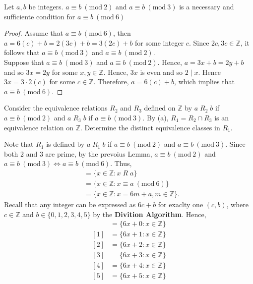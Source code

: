 \documentclass[12pt]{article}
\newcommand{\Z}{\mathbb{Z}}
\newcommand{\Mod}[1]{\ (\mathrm{mod}\ #1)}
\newenvironment{lemma}[2][Lemma]{\begin{trivlist}
		\item[\hskip \labelsep {\bfseries #1}\hskip \labelsep {\bfseries #2.}]}{\end{trivlist}}
\newenvironment{problem}[2][Problem]{\begin{trivlist}
		\item[\hskip \labelsep {\bfseries #1}\hskip \labelsep {\bfseries #2.}]}{\end{trivlist}}
\newenvironment{solution}[2][Solution]{\begin{trivlist}
		\item[\hskip \labelsep {\bfseries #1}\hskip \labelsep {\bfseries #2.}]}{\end{trivlist}}
\begin{document}
\begin{problem}{41}
\begin{enumerate}[label=(\alph*)]
 		\begin{lemma}{8.4.1}
 			Let  $a,b$ be integers. $a \equiv b \Mod{2}$ and $a\equiv b \Mod{3}$ is a necessary and sufficiente condition for $a\equiv b \Mod{6}$
 			\begin{proof}
 				Assume that $a\equiv b \Mod{6}$, then $a=6(c) +b = 2(3c) + b = 3(2c)+b$ for some integer $c$. Since $2c,3c\in \Z$, it follows that $a \equiv b \Mod{3}$ and $a\equiv b \Mod{2}$. \\
 				Suppose that $a \equiv b \Mod{3}$ and $a\equiv b \Mod{2}$. Hence, $a=3x+b=2y+b$ and so $3x=2y$ for some $x,y\in \Z$. Hence, $3x$ is even and so $2 \mid x$.  Hence $3x = 3\cdot 2(c)$ for some $c\in \Z$. Therefore, $a=6(c) + b$, which implies that $a\equiv b \Mod{6}$.
 			\end{proof}
 		\end{lemma}
 			\item Consider the equivalence relations $R_{2}$ and $R_{3}$ defined on $\Z$ by $a\; R_{2} \;b$ if $a\equiv b \Mod 2$ and $a\; R_{3}\; b$ if $a\equiv b \Mod{3}$. By (a), $R_{1} = R_{2}\cap R_{3}$ is an equivalence relation on $\Z$. Determine the distinct equivalence classes in $R_{1}$.
 			\begin{solution}{b}
 				Note that $R_{1}$ is defined by $a\; R_{1}\; b$ if $a\equiv b \Mod 2$ and $a\equiv b \Mod{3}$. Since both 2 and 3 are prime, by the prevoius Lemma, $a\equiv b \Mod 2$ and $a\equiv b \Mod{3} \iff a\equiv b\Mod{6}$. Thus, 
 				\begin{align*}
 					[a] &= \{x\in \Z:x\; R\;a\}\\
 					&= \{x\in \Z: x\equiv a\Mod{6}\}\\
 					&= \{x\in \Z: x = 6m + a, m\in \Z\}.
 				\end{align*}
 			Recall that any integer can be expressed as $6c+b$ for exaclty one $(c,b)$, where $c\in \Z$ and $b\in \{0,1,2,3,4,5\}$ by the \textbf{Divition Algorithm}. Hence,
 			\begin{align*}
 				[0] &= \{6x+0:x\in \Z\}\\
 				[1] &= \{6x+1:x\in \Z\}\\
 				[2] &= \{6x+2:x\in \Z\}\\
 				[3] &= \{6x+3:x\in \Z\}\\
 				[4] &= \{6x+4:x\in \Z\}\\
 				[5] &= \{6x+5:x\in \Z\}\\
 			\end{align*}
 			\end{solution}
  		\end{enumerate}
 	\end{problem}
 
\end{document}

